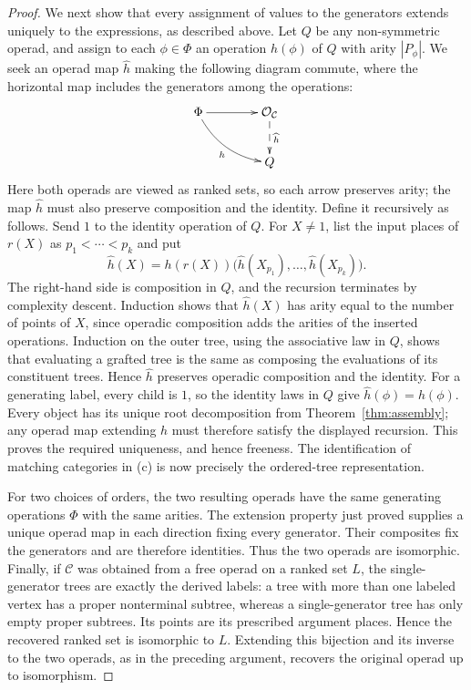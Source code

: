 \documentclass[11pt,a4paper]{article}
\theoremstyle{plain}
\theoremstyle{definition}
\theoremstyle{remark}
\newcommand{\C}{\mathcal C}
\newcommand{\one}{1}
\begin{document}
\begin{proof}
We next show that every assignment of values to the generators
extends uniquely to the expressions, as described above.
Let $Q$ be any non-symmetric operad, and assign to each
$\phi\in\Phi$ an operation $h(\phi)$ of $Q$
with arity $|P_\phi|$. We seek an operad map $\widehat h$ making
the following diagram commute, where the horizontal map includes
the generators among the operations:
\[
\xymatrix@C=4em@R=2.5em{
\Phi\ar[r]\ar@/_0.8pc/[dr]_h&\mathcal O_\C\ar@{-->}[d]^{\widehat h}\\
&Q
}
\]
Here both operads are viewed as ranked sets, so each arrow preserves
arity; the map $\widehat h$ must also preserve composition and
the identity. Define it recursively as follows. Send $\one$ to the identity
operation of $Q$. For $X\ne\one$, list the input places of
$r(X)$ as $p_1<\cdots<p_k$ and put
\[
 \widehat h(X)=
 h(r(X))\bigl(\widehat h(X_{p_1}),\ldots,
                         \widehat h(X_{p_k})\bigr).
\]
The right-hand side is composition in $Q$, and the recursion
terminates by complexity descent. Induction shows that
$\widehat h(X)$ has arity equal to the number of points of $X$,
since operadic composition adds the arities of the inserted
operations. Induction on the outer tree,
using the associative law in $Q$, shows that evaluating a grafted
tree is the same as composing the evaluations of its constituent
trees. Hence $\widehat h$ preserves operadic composition and the
identity. For a generating label, every child is $\one$, so the
identity laws in $Q$ give $\widehat h(\phi)=h(\phi)$.
Every object has its unique root decomposition from
Theorem~\ref{thm:assembly}; any operad map extending $h$ must
therefore satisfy the displayed recursion. This proves the
required uniqueness, and hence freeness. The identification
of matching categories in \textup{(c)} is now precisely the
ordered-tree representation.

For two choices of orders, the two resulting operads have the
same generating operations $\Phi$ with the same arities. The
extension property just proved supplies a
unique operad map in each direction fixing every generator.
Their composites fix the generators and are therefore identities.
Thus the two operads are isomorphic. Finally, if $\C$ was obtained
from a free operad on a ranked set $L$, the single-generator trees
are exactly the derived labels: a tree with more than one labeled
vertex has a proper nonterminal subtree, whereas a
single-generator tree has only empty proper subtrees. Its points
are its prescribed argument places. Hence the recovered ranked
set is isomorphic to $L$. Extending this bijection and its inverse
to the two operads, as in the preceding argument, recovers the
original operad up to isomorphism.
\end{proof}
\end{document}
